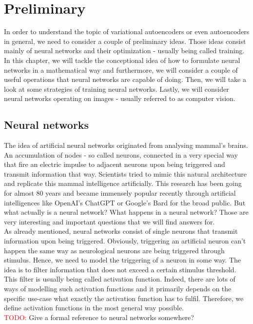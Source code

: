 \chapter{Preliminary}\label{preliminary}
In order to understand the topic of variational autoencoders or even autoencoders in general, we need to consider a couple of preliminary ideas. Those ideas consist mainly of neural networks and their optimization - usually being called training. In this chapter, we will tackle the conceptional idea of how to formulate neural networks in a mathematical way and furthermore, we will consider a couple of useful operations that neural networks are capable of doing. Then, we will take a look at some strategies of training neural networks. Lastly, we will consider neural networks operating on images - usually referred to as computer vision.

\section{Neural networks}
The idea of artificial neural networks originated from analysing mammal's brains. An accumulation of nodes - so called neurons, connected in a very special way that fire an electric impulse to adjacent neurons upon being triggered and transmit information that way. Scientists tried to mimic this natural architecture and replicate this mammal intelligence artificially. This research has been going for almost 80 years and became immensely popular recently through artificial intelligences like OpenAI's ChatGPT or Google's Bard for the broad public. But what actually is a neural network? What happens in a neural network? Those are very interesting and important questions that we will find answers for.\\
As already mentioned, neural networks consist of single neurons that transmit information upon being \glqq triggered\grqq{}. Obviously, triggering an artificial neuron can't happen the same way as neurological neurons are being triggered through stimulus. Hence, we need to model the triggering of a neuron in some way. The idea is to filter information that does not exceed a certain stimulus threshold. This filter is usually being called activation function. Indeed, there are lots of ways of modelling such activation functions and it primarily depends on the specific use-case what exactly the activation function has to fulfil. Therefore, we define activation functions in the most general way possible.\\
\textcolor{red}{TODO:} Give a formal reference to neural networks somewhere?

